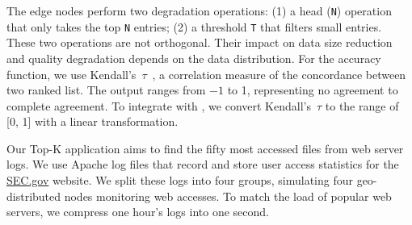 The edge nodes perform two degradation operations: (1) a head (\texttt{N})
operation that only takes the top \texttt{N} entries; (2) a threshold \texttt{T}
that filters small entries. These two operations are not orthogonal. Their impact on data size reduction and quality degradation depends on
the data distribution. For the accuracy function, we use Kendall's~$\tau$~\cite{abdi2007kendall}, a correlation measure of the
concordance between two ranked list. The output ranges from \(-1\) to 1,
representing no agreement to complete agreement. To integrate with \sysname{},
we convert Kendall's~$\tau$ to the range of [0, 1] with a linear transformation.

Our Top-K application aims to find the fifty most accessed files from web server
logs. We use Apache log files that record and store user access statistics for
the \href{https://www.sec.gov}{SEC.gov} website. We split these logs into four
groups, simulating four geo-distributed nodes monitoring web accesses.
To match the load of popular web servers, we compress one hour's logs into one second.

